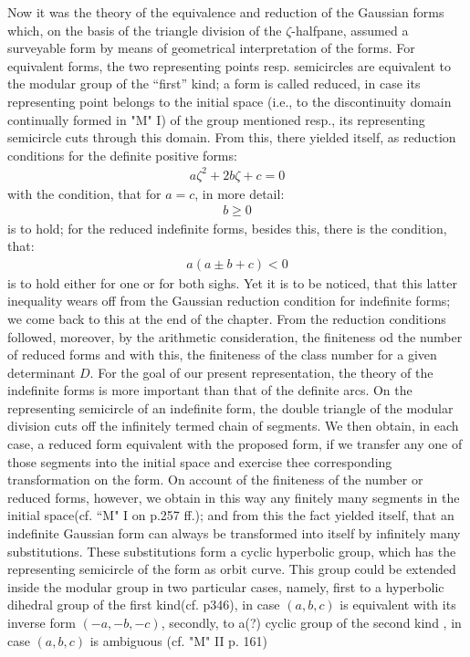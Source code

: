 Now it was the theory of the equivalence and reduction of the Gaussian forms which, on the basis of the triangle division of the $\zeta$-halfpane, assumed a surveyable form by means of geometrical interpretation of the forms. For equivalent forms, the two representing points resp. semicircles are equivalent to the modular group of the “first” kind; a form is called reduced, in case its representing point belongs to the initial space (i.e., to the discontinuity domain continually formed in "M" I) of the group mentioned resp., its representing semicircle cuts through this domain. From this, there yielded itself, as reduction conditions for the definite positive forms:
\begin{align}\label{eq:13}
a\zeta^2+2b\zeta+c=0
\end{align}
with the condition, that for $a=c$, in more detail:
\begin{align}\label{eq:14}
b\geq 0
\end{align}
is to hold; for the reduced indefinite forms, besides this, there is the condition, that:
\begin{align}
a(a\pm b+c)<0
\end{align}
is to hold either for one or for both sighs. Yet it is to be noticed, that this latter inequality wears off from the Gaussian reduction condition for indefinite forms; we come back to this at the end of the chapter.
From the reduction conditions followed, moreover, by the arithmetic consideration, the finiteness od the number of reduced forms and with this, the finiteness of the class number for a given determinant $D$.
For the goal of our present representation, the theory of the indefinite forms is more important than that of the definite arcs. On the representing semicircle of an indefinite form, the double triangle of the modular division cuts off the infinitely termed chain of segments. We then obtain, in each case, a reduced form equivalent with the proposed form, if we transfer any one of those segments into the initial space and exercise thee corresponding transformation on the form. On account of the finiteness of the number or reduced forms, however, we obtain in this way any finitely many segments in the initial space(cf. “M" I on p.257 ff.); and from this the fact yielded itself, that an indefinite Gaussian form can always be transformed into itself by infinitely many substitutions. These substitutions form a cyclic hyperbolic group, which has the representing semicircle of the form as orbit curve.
This group could be extended inside the modular group in two particular cases, namely, first to a hyperbolic dihedral group of the first kind(cf. p346), in case $(a,b,c)$ is equivalent with its inverse form $(-a,-b,-c)$, secondly, to a(?) cyclic group of the second kind , in case $(a,b,c)$ is ambiguous (cf. "M" II p. 161)
